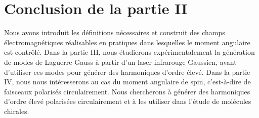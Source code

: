 \section*{Conclusion de la partie II}
Nous avons introduit les définitions nécessaires et construit des champs électromagnétiques réalisables en pratiques dans lesquelles le moment angulaire est contrôlé. Dans la partie III, nous étudierons expérimentalement la génération de modes de Laguerre-Gauss à partir d'un laser infrarouge Gaussien, avant d'utiliser ces modes pour générer des harmoniques d'ordre élevé. Dans la partie IV, nous nous intéresserons au cas du moment angulaire de spin, c'est-à-dire de faisceaux polarisés circulairement. Nous chercherons à générer des harmoniques d'ordre élevé polarisées circulairement et à les utiliser dans l'étude de molécules chirales.